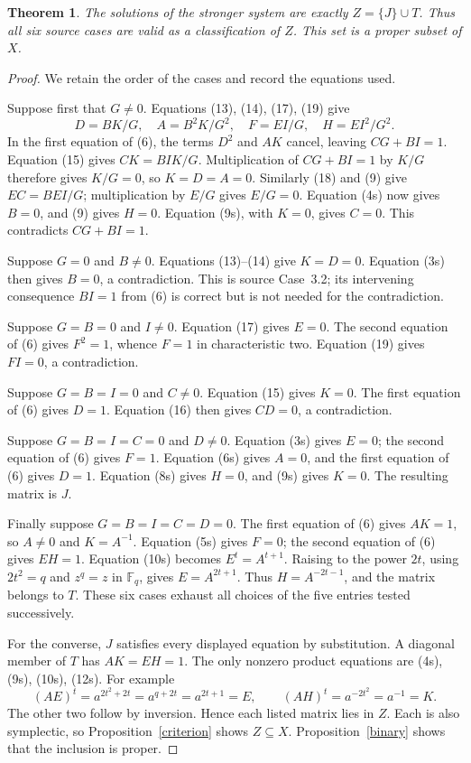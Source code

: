 \documentclass[11pt,a4paper]{article}
\newtheorem{theorem}{Theorem}
\newcommand{\F}{\mathbb F}
\begin{document}
\begin{theorem}\label{strong}
The solutions of the stronger system are exactly $Z=\{J\}\cup T$.
Thus all six source cases are valid as a classification of $Z$.
This set is a proper subset of $X$.
\end{theorem}
\begin{proof}
We retain the order of the cases and record the equations used.

Suppose first that $G\ne0$. Equations (13), (14), (17), (19) give
\[
 D=BK/G,\quad A=B^2K/G^2,\quad
 F=EI/G,\quad H=EI^2/G^2.
 \tag{9}
\]
In the first equation of (6), the terms $D^2$ and $AK$ cancel,
leaving $CG+BI=1$. Equation (15) gives $CK=BIK/G$.
Multiplication of $CG+BI=1$ by $K/G$ therefore gives $K/G=0$,
so $K=D=A=0$. Similarly (18) and (9) give $EC=BEI/G$;
multiplication by $E/G$ gives $E/G=0$. Equation (4s) now gives
$B=0$, and (9) gives $H=0$. Equation (9s), with $K=0$, gives
$C=0$. This contradicts $CG+BI=1$.

Suppose $G=0$ and $B\ne0$. Equations (13)--(14) give $K=D=0$.
Equation (3s) then gives $B=0$, a contradiction. This is source
Case~3.2; its intervening consequence $BI=1$ from (6) is correct
but is not needed for the contradiction.

Suppose $G=B=0$ and $I\ne0$. Equation (17) gives $E=0$.
The second equation of (6) gives $F^2=1$, whence $F=1$ in
characteristic two. Equation (19) gives $FI=0$, a contradiction.

Suppose $G=B=I=0$ and $C\ne0$. Equation (15) gives $K=0$.
The first equation of (6) gives $D=1$. Equation (16) then gives
$CD=0$, a contradiction.

Suppose $G=B=I=C=0$ and $D\ne0$. Equation (3s) gives $E=0$;
the second equation of (6) gives $F=1$. Equation (6s) gives
$A=0$, and the first equation of (6) gives $D=1$. Equation (8s)
gives $H=0$, and (9s) gives $K=0$. The resulting matrix is $J$.

Finally suppose $G=B=I=C=D=0$. The first equation of (6) gives
$AK=1$, so $A\ne0$ and $K=A^{-1}$. Equation (5s) gives $F=0$;
the second equation of (6) gives $EH=1$. Equation (10s) becomes
$E^t=A^{t+1}$. Raising to the power $2t$, using $2t^2=q$ and
$z^q=z$ in $\F_q$, gives $E=A^{2t+1}$. Thus $H=A^{-2t-1}$,
and the matrix belongs to $T$. These six cases exhaust all choices
of the five entries tested successively.

For the converse, $J$ satisfies every displayed equation by
substitution. A diagonal member of $T$ has $AK=EH=1$.
The only nonzero product equations are (4s), (9s), (10s), (12s).
For example
\[
 (AE)^t=a^{2t^2+2t}=a^{q+2t}=a^{2t+1}=E,
 \qquad (AH)^t=a^{-2t^2}=a^{-1}=K.
\]
The other two follow by inversion. Hence each listed matrix lies
in $Z$. Each is also symplectic, so Proposition~\ref{criterion}
shows $Z\subseteq X$. Proposition~\ref{binary} shows that the
inclusion is proper.
\end{proof}
\end{document}
